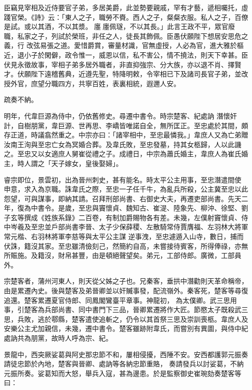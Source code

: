 \begin{pinyinscope}
 臣竊見宰相及近侍要官子弟，多居美爵，此並勢要親戚，罕有才藝，遞相囑托，虛踐官榮。《詩》云：「東人之子，職勞不賚。西人之子，粲粲衣服。私人之子，百僚是試。或以其酒，不以其漿。廛廛佩璲，不以其長。」此言王政不平，眾官廢職，私家之子，列試於榮班，非任之人，徒長其飾佩。臣愚伏願陛下想居安思危之義，行
 改弦易張之道。愛惜爵賞，審量材識，官無虛授，人必為官，進大雅於樞近，退小子於閑僻，政令惟一，威恩以信，私不害公，情不撓法，則天下幸甚。臣伏見永徵故事，宰相子弟多居外職者，非直抑強宗、分大族，亦以退不肖、擇賢才。伏願陛下遠稽舊典，近遵先聖，特降明敕，令宰相已下及諸司長官子弟，並改授外官，庶望分職四方，共寧百姓，表裏相統，遐邇人安。



 疏奏不納。



 明年，代韋巨源為侍中，仍依舊修史。尋遷中書令。時宗楚客、紀處訥
 潛懷奸計，自樹朋黨，韋巨源、世再思、李嶠皆唯諾自全，無所匡正。至忠處於其間，頗存正道，時議翕然重之。中宗亦曰：「諸宰相中，至忠最憐我。」韋庶人又為亡弟贈汝南王洵與至忠亡女為冥婚合葬。及韋氏敗，至忠發墓，持其女柩歸，人以此譏之。至忠又以女適庶人舅崔從禮之子。成禮日，中宗為蕭氏婚主，韋庶人為崔氏婚主，時人謂之「天子嫁女，皇後娶婦」。



 睿宗即位，景雲初，出為晉州刺史，甚有能名。時太平公主用事，至忠潛遣間使
 申意，求入為京職。誅韋氏之際，至忠一子任千牛，為亂兵所殺，公主冀至忠以此怨望，可與謀事，即納其請。召拜刑部尚書、右御史大夫，再遷吏部尚書。先天二年，復為中書令。是歲，至忠與竇懷貞、魏知古、崔湜、陸象先、柳沖、徐堅、劉子玄等撰成《姓族系錄》二百卷，有制加爵賜物各有差。未幾，左僕射竇懷貞、侍中岑羲及至忠並戶部尚書李晉、太子少保薛稷、左散騎常侍賈膺福、左羽林大將軍常元楷、右羽林將軍李慈等與太平公主謀
 逆事洩，至忠遽遁入山寺，數日，捕而伏誅，籍沒其家。至忠雖清儉刻己，然簡約自高，未嘗接待賓客，所得俸祿，亦無所賑施。及籍沒，財帛甚豐，由是頓絕聲望矣。弟元，工部侍郎。廣微，工部員外。



 宗楚客者，蒲州河東人，則天從父姊之子也。兄秦客，垂拱中潛勸則天革命稱帝，由是累遷內史。後與楚客及弟晉卿並以奸贓事發，配流嶺外。秦客死，楚客等尋復追還。楚客累遷夏官侍郎、同鳳閣鸞臺平章事。神龍初，
 為太僕卿。武三思用事，引楚客為兵部尚書、同中書門下三品，晉卿累遷將作大匠。節愍太子既殺武三思，兵敗，逃於鄠縣，楚客遣使追斬之，仍令以其首祭三思及崇訓喪柩。韋庶人及安樂公主尤加親信，未幾，遷中書令。楚客雖跡附韋氏，而嘗別有異圖，與侍中紀處訥共為朋黨，故時人呼為宗、紀。



 景龍中，西突厥娑葛與阿史那忠節不和，屢相侵擾，西陲不安。安西都護郭元振奏請徒忠節於內地，楚客與晉卿、處訥等各納忠節重賂，
 奏請發兵以討娑葛，不納元振所奏。娑葛知而大怒，舉兵入寇，甚為邊患。於是監察御史崔琬劾奏楚客等曰：




\end{pinyinscope}
